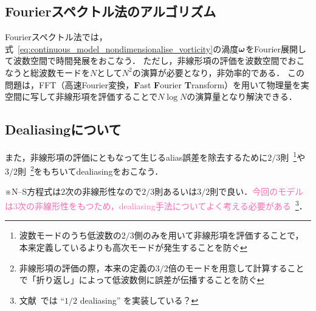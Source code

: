 \documentclass[12pt,dvipdfmx,svgnames,a4paper,uplatex]{ujarticle}
\theoremstyle{plain}
\begin{document}
\subsection{Fourierスペクトル法のアルゴリズム}
\label{sec:Fourier_spectral_method_algorithm}

Fourierスペクトル法では，式~\ref{eq:continuous_model_nondimensionalise_vorticity}の渦度\(\vb*{\omega}\)をFourier展開して波数空間で時間発展をおこなう．
ただし，非線形項の評価を波数空間でおこなうと総波数モードを\(N\)として\(N^2\)の演算が必要となり，非効率的である．
この問題は，FFT（高速Fourier変換，\textbf{F}ast \textbf{F}ourier \textbf{T}ransform）を用いて物理量を実空間に写して非線形項を評価することで\(N \log N\)の演算量となり解決できる．


\subsection{Dealiasingについて}
\label{sec:dealiasing}

また，非線形項の評価にともなって生じるalias誤差を除去するために\(2/3\)則~\footnote{波数モードのうち低波数の\(2/3\)側のみを用いて非線形項を評価することで，本来定義しているよりも高次モードが発生することを防ぐ}や\(3/2\)則~\footnote{非線形項の評価の際，本来の定義の\(3/2\)倍のモードを用意して計算することで「折り返し」によって低波数側に誤差が伝播することを防ぐ}をもちいてdealiasingをおこなう．

※N--S方程式は\(2\)次の非線形性なので\(2/3\)則あるいは\(3/2\)則で良い．\textcolor{HotPink}{今回のモデルは\(3\)次の非線形性をもつため，dealiasing手法についてよく考える必要がある}~\footnote{文献~\cite{James}では ``\(1/2\) dealiasing'' を実装している？}．


\printbibliography[title=参考文献]
\end{document}
